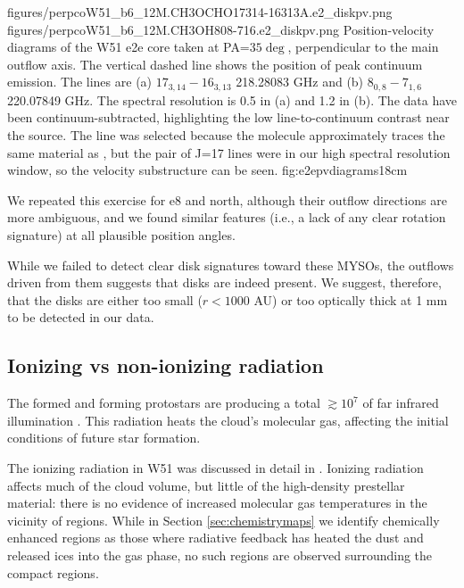 \documentclass{emulateapj}
\begin{document}
\FigureTwo
{figures/perpcoW51_b6_12M.CH3OCHO17314-16313A.e2_diskpv.png}
{figures/perpcoW51_b6_12M.CH3OH808-716.e2_diskpv.png}
{Position-velocity diagrams of the W51 e2e core taken at PA=$35\deg$,
perpendicular to the main outflow axis.  The vertical dashed line shows the
position of peak continuum emission. The lines are (a) \methylformate
$17_{3,14}-16_{3,13}$ 218.28083 GHz and (b) \methanol $8_{0,8}-7_{1,6}$
220.07849 GHz.  The spectral resolution is 0.5 \kms in (a) and 1.2 \kms in (b).
The data have been continuum-subtracted, highlighting the low line-to-continuum
contrast near the source.  The \methylformate line was selected because the
molecule approximately traces the same material as \methanol, but the pair of
\methylformate J=17 lines were in our high spectral resolution window, so the
velocity substructure can be seen.
}
{fig:e2epvdiagrams}{1}{8cm}


We repeated this exercise for e8 and north, although their outflow directions
are more ambiguous, and we found similar features (i.e., a lack of any clear
rotation signature) at all plausible position angles.

While we failed to detect clear disk signatures toward these MYSOs, the outflows
driven from them suggests that disks are indeed present.  We suggest, therefore,
that the disks are either too small ($r<1000$ AU) or too optically thick at 1 mm to
be detected in our data.





\subsection{Ionizing vs non-ionizing radiation}
\label{sec:nonionizingradiation}
The formed and forming protostars are producing a total $\gtrsim10^7$ \lsun of
far infrared illumination \citep{Ginsburg2016b}.  This radiation heats the
cloud's molecular gas, affecting the initial conditions of future star
formation.

The ionizing radiation in W51 was discussed in detail in \citet{Ginsburg2016b}.
Ionizing radiation affects much of the cloud volume, but little of the
high-density prestellar material:  there is no evidence of increased molecular gas
temperatures in the vicinity of \hii regions.  While in Section
\ref{sec:chemistrymaps} we identify chemically enhanced regions as those where
radiative feedback has heated the dust and released ices into the gas phase, no
such regions are observed surrounding the compact \hii regions.
\end{document}
